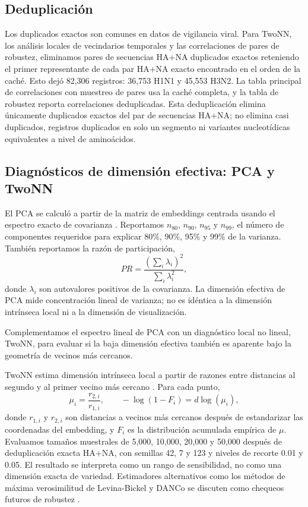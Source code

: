 \documentclass[11pt]{article}
\begin{document}
\subsection{Deduplicación}

Los duplicados exactos son comunes en datos de vigilancia viral. Para TwoNN, los análisis locales de vecindarios temporales y las correlaciones de pares de robustez, eliminamos pares de secuencias HA+NA duplicados exactos reteniendo el primer representante de cada par HA+NA exacto encontrado en el orden de la caché. Esto dejó 82,306 registros: 36,753 H1N1 y 45,553 H3N2. La tabla principal de correlaciones con muestreo de pares usa la caché completa, y la tabla de robustez reporta correlaciones deduplicadas. Esta deduplicación elimina únicamente duplicados exactos del par de secuencias HA+NA; no elimina casi duplicados, registros duplicados en solo un segmento ni variantes nucleotídicas equivalentes a nivel de aminoácidos.

\subsection{Diagnósticos de dimensión efectiva: PCA y TwoNN}

El PCA se calculó a partir de la matriz de embeddings centrada usando el espectro exacto de covarianza \cite{jolliffe2002pca,jolliffe2016pca}. Reportamos $n_{80}$, $n_{90}$, $n_{95}$ y $n_{99}$, el número de componentes requeridos para explicar 80\%, 90\%, 95\% y 99\% de la varianza. También reportamos la razón de participación,
\[
PR=\frac{(\sum_i\lambda_i)^2}{\sum_i\lambda_i^2},
\]
donde $\lambda_i$ son autovalores positivos de la covarianza. La dimensión efectiva de PCA mide concentración lineal de varianza; no es idéntica a la dimensión intrínseca local ni a la dimensión de visualización.

Complementamos el espectro lineal de PCA con un diagnóstico local no lineal, TwoNN, para evaluar si la baja dimensión efectiva también es aparente bajo la geometría de vecinos más cercanos.

TwoNN estima dimensión intrínseca local a partir de razones entre distancias al segundo y al primer vecino más cercano \cite{facco2017intrinsic}. Para cada punto,
\[
\mu_i=\frac{r_{2,i}}{r_{1,i}},
\qquad
-\log(1-F_i)=d\log(\mu_i),
\]
donde $r_{1,i}$ y $r_{2,i}$ son distancias a vecinos más cercanos después de estandarizar las coordenadas del embedding, y $F_i$ es la distribución acumulada empírica de $\mu$. Evaluamos tamaños muestrales de 5,000, 10,000, 20,000 y 50,000 después de deduplicación exacta HA+NA, con semillas 42, 7 y 123 y niveles de recorte 0.01 y 0.05. El resultado se interpreta como un rango de sensibilidad, no como una dimensión exacta de variedad. Estimadores alternativos como los métodos de máxima verosimilitud de Levina-Bickel y DANCo se discuten como chequeos futuros de robustez \cite{levina2005maximum,ceruti2014danco}.
\end{document}
